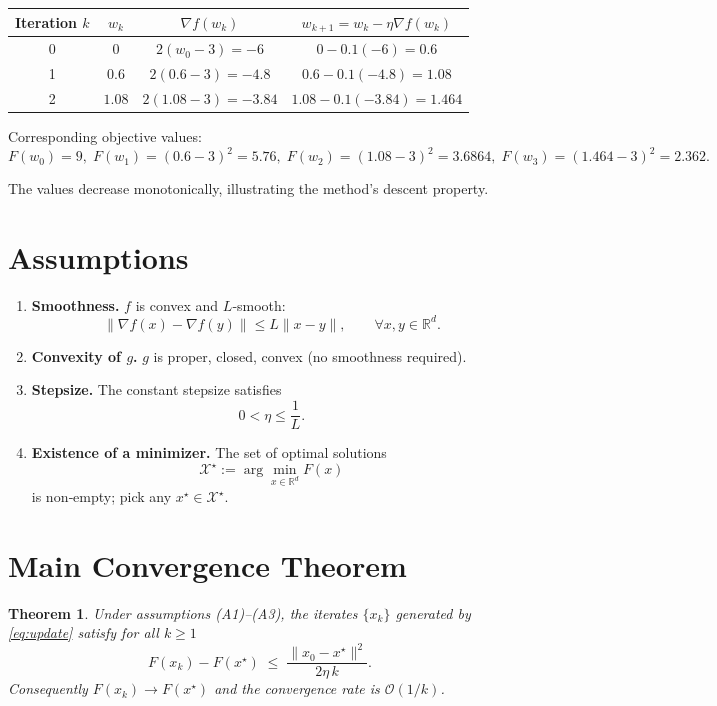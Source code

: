 \documentclass{article}
\newtheorem{theorem}{Theorem}
\newcommand{\R}{\mathbb{R}}
\begin{document}
\begin{center}
\begin{tabular}{c|c|c|c}
Iteration $k$ & $w_{k}$ & $\nabla f(w_{k})$ & $w_{k+1}=w_{k}-\eta\nabla f(w_{k})$\\\hline
0 & $0$ & $2(w_{0}-3)=-6$ & $0-0.1(-6)=0.6$\\
1 & $0.6$ & $2(0.6-3)=-4.8$ & $0.6-0.1(-4.8)=1.08$\\
2 & $1.08$ & $2(1.08-3)=-3.84$ & $1.08-0.1(-3.84)=1.464$\\
\end{tabular}
\end{center}
Corresponding objective values:
\[
F(w_{0})=9,\;F(w_{1})=(0.6-3)^{2}=5.76,\;F(w_{2})=(1.08-3)^{2}=3.6864,\;F(w_{3})=(1.464-3)^{2}=2.362.
\]

The values decrease monotonically, illustrating the method’s descent property.

\section*{Assumptions}
\begin{enumerate}[label=(A\arabic*)]
\item \textbf{Smoothness.} $f$ is convex and $L$‑smooth:
\[
\|\nabla f(x)-\nabla f(y)\|\le L\|x-y\|,\qquad\forall x,y\in\R^{d}.
\tag{A1}
\]
\item \textbf{Convexity of $g$.} $g$ is proper, closed, convex (no smoothness required). 
\item \textbf{Stepsize.} The constant stepsize satisfies
\[
0<\eta\le\frac{1}{L}. \tag{A3}
\]
\item \textbf{Existence of a minimizer.} The set of optimal solutions 
\[
\mathcal{X}^{\star}:=\arg\min_{x\in\R^{d}}F(x)
\]
is non‑empty; pick any $x^{\star}\in\mathcal{X}^{\star}$.
\end{enumerate}

\section*{Main Convergence Theorem}
\begin{theorem}
\label{thm:rate}
Under assumptions (A1)–(A3), the iterates $\{x_{k}\}$ generated by \eqref{eq:update} satisfy for all $k\ge1$
\[
F(x_{k})-F(x^{\star})\;\le\;\frac{\|x_{0}-x^{\star}\|^{2}}{2\eta\,k}.
\tag{T1}
\]
Consequently $F(x_{k})\to F(x^{\star})$ and the convergence rate is $\mathcal{O}(1/k)$.
\end{theorem}
\end{document}
